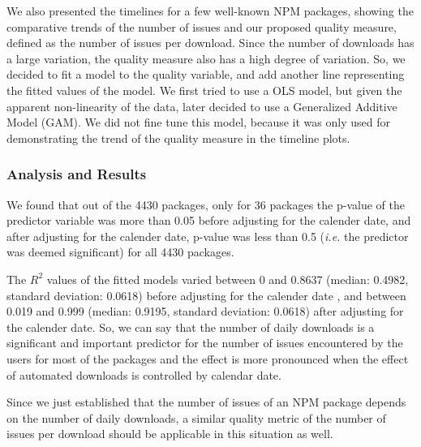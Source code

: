 \documentclass[smallcondensed]{svjour3}     %
\begin{document}
We also presented the timelines for a few well-known NPM packages, showing the comparative trends of the number of issues and our proposed quality measure, defined as the number of issues per download. Since the number of downloads has a large variation, the quality measure also has a high degree of variation. So, we decided to fit a model to the quality variable, and add another line representing the fitted values of the model. We first tried to use a OLS model, but given the apparent non-linearity of the data, later decided to use a Generalized Additive Model (GAM). We did not fine tune this model, because it was only used for demonstrating the trend of the quality measure in the timeline plots.

\subsubsection{Analysis and Results}
\vspace{-10pt}
We found that out of the 4430 packages, only for 36 packages the p-value of the predictor variable was more than 0.05 before adjusting for the calender date, and after adjusting for the calender date, p-value was less than 0.5 (\emph{i.e.} the predictor was deemed significant) for all 4430 packages. 

The $R^2$ values of the fitted models varied between 0 and 0.8637 (median: 0.4982, standard deviation: 0.0618) before adjusting for the calender date , and between 0.019 and 0.999 (median: 0.9195, standard deviation: 0.0618) after  adjusting for the calender date. So, we can say that the number of daily downloads is a significant and important predictor for the number of issues encountered by the users for most of the packages and the effect is more pronounced when the effect of automated downloads is controlled by calendar date. 

Since we just established that the number of issues of an NPM package depends on the number of daily downloads, a similar quality metric of the number of issues per download should be applicable in this situation as well. 
\end{document}
